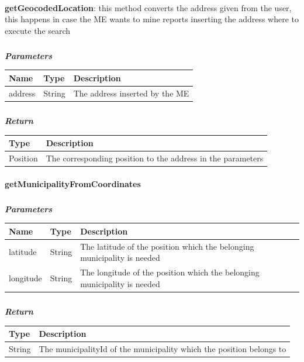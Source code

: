					\paragraph{}
							\textbf{getGeocodedLocation}: this method converts the address given from the user, this happens in case the ME wants to mine reports inserting the address where to execute the search
							\subparagraph{}
							\textit{\textbf{Parameters}}
								\begin{table}[!h]
									\begin{tabular}{L{0.2\textwidth}L{0.2\textwidth}L{0.2\textwidth}}
										\toprule
										Name & Type & Description \\
										\midrule
								  		address & String & The address inserted by the ME \\
								 		\bottomrule
									\end{tabular}
								\end{table}
							\subparagraph{}
								\textit{\textbf{Return}}
									\begin{table}[!h]
									\begin{tabular}{L{0.3\textwidth}L{0.3\textwidth}}
										\toprule
										Type & Description \\
										\midrule
								  		Position & The corresponding position to the address in the parameters \\
								 		\bottomrule
									\end{tabular}
								\end{table}
						
					\paragraph{}
							\textbf{getMunicipalityFromCoordinates}
							\subparagraph{}
							\textit{\textbf{Parameters}}
								\begin{table}[!h]
									\begin{tabular}{L{0.2\textwidth}L{0.2\textwidth}L{0.2\textwidth}}
										\toprule
										Name & Type & Description \\
										\midrule
								  		latitude & String & The latitude of the position which the belonging municipality is needed \\
								  		longitude & String & The longitude of the position which the belonging municipality is needed \\
								 		\bottomrule
									\end{tabular}
								\end{table}
							\subparagraph{}
								\textit{\textbf{Return}}
									\begin{table}[!h]
									\begin{tabular}{L{0.3\textwidth}L{0.3\textwidth}}
										\toprule
										Type & Description \\
										\midrule
								  		String & The municipalityId of the municipality which the position belongs to \\
								 		\bottomrule
									\end{tabular}
								\end{table}
							
